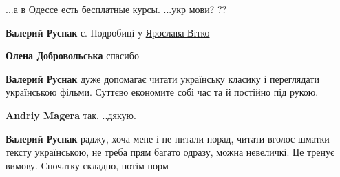  
...а в Одессе есть бесплатные курсы. ...укр мови? ??

\begin{itemize} %
 
\textbf{Валерий Руснак} є. Подробиці у 
\href{https://www.facebook.com/yaroslava.vitko}{Ярослава Вітко}

 
\textbf{Олена Добровольська} спасибо

 

\textbf{Валерий Руснак} дуже допомагає читати українську класику і переглядати українською фільми. Суттєво економите собі час та й постійно під рукою.

 
\textbf{Andriy Magera} так. ..дякую.

 
\textbf{Валерий Руснак} раджу, хоча мене і не питали порад, читати вголос шматки тексту українською, не треба прям багато одразу, можна невеличкі. Це тренує вимову. Спочатку складно, потім норм


\end{itemize}

